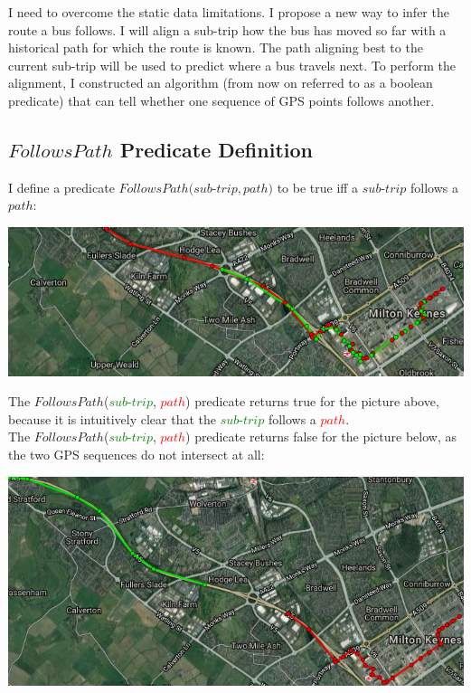 \documentclass[12pt,a4paper,oneside,openright]{report}
\begin{document}
I need to overcome the static data limitations. I propose a new way to infer the
route a bus follows. I will align a sub-trip how the bus has moved
so far with a historical path for which the route is known. The path aligning
best to the current sub-trip will be used to predict where a bus travels next.
To perform the alignment, I constructed an algorithm (from now on referred
to as a boolean predicate) that can tell whether one sequence of GPS points 
follows another.

\subsection{$FollowsPath$ Predicate Definition}

I define a predicate $FollowsPath(sub$-$trip, path)$ to be true iff a $sub$-$trip$
follows a $path$:

\includegraphics[width=\textwidth]{figs/follows.png}

The $FollowsPath$(\textcolor{green}{$sub$-$trip$}, \textcolor{red}{$path$}) 
predicate returns true for the picture above, because it is intuitively clear that
the \textcolor{green}{$sub$-$trip$} follows a \textcolor{red}{$path$}. \\

The $FollowsPath$(\textcolor{green}{$sub$-$trip$}, \textcolor{red}{$path$})
predicate returns false for the picture below, as the two GPS sequences do not intersect at all:

\:

\includegraphics[width=\textwidth]{figs/not_follows_path.png}
\end{document}
